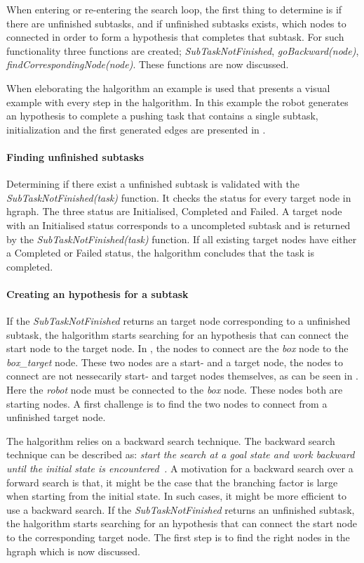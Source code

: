 When entering or re-entering the search loop, the first thing to determine is if there are unfinished subtasks, and if unfinished subtasks exists, which nodes to connected in order to form a hypothesis that completes that subtask. For such functionality three functions are created; \textit{SubTaskNotFinished}, \textit{goBackward(\gls{node})}, \textit{findCorrespondingNode(\gls{node})}. These functions are now discussed.\bs

When eleborating the \ac{halgorithm} an example is used that presents a visual example with every step in the \ac{halgorithm}. In this example the robot generates an hypothesis to complete a pushing task that contains a single subtask, initialization and the first generated edges are presented in .\bs

\paragraph{Finding unfinished subtasks}
Determining if there exist a unfinished subtask is validated with the \textit{SubTaskNotFinished(\gls{task})} function. It checks the status for every target node in \ac{hgraph}. The three status are Initialised, Completed and Failed. A target node with an Initialised status corresponds to a uncompleted subtask and is returned by the \textit{SubTaskNotFinished(\gls{task})} function. If all existing target nodes have either a Completed or Failed status, the \ac{halgorithm} concludes that the task is completed.\bs

\paragraph{Creating an hypothesis for a subtask}
If the \textit{SubTaskNotFinished} returns an target node corresponding to a unfinished subtask, the \ac{halgorithm} starts searching for an hypothesis that can connect the start node to the target node. In , the nodes to connect are the \textit{box} node to the \textit{box\_target} node. These two nodes are a start- and a target node, the nodes to connect are not nessecarily start- and target nodes themselves, as can be seen in . Here the \textit{robot} node must be connected to the \textit{box} node. These nodes both are starting nodes. A first challenge is to find the two nodes to connect from a unfinished target node.\bs

 The \ac{halgorithm} relies on a backward search technique. The backward search technique can be described as: \textit{start the search at a goal state and work backward until the initial state is encountered~\cite{lavalle_planning_2006}.} A motivation for a backward search over a forward search is that, it might be the case that the branching factor is large when starting from the initial state. In such cases, it might be more efficient to use a backward search. If the \textit{SubTaskNotFinished} returns an unfinished subtask, the \ac{halgorithm} starts searching for an hypothesis that can connect the start node to the corresponding target node. The first step is to find the right nodes in the \ac{hgraph} which is now discussed.\bs

